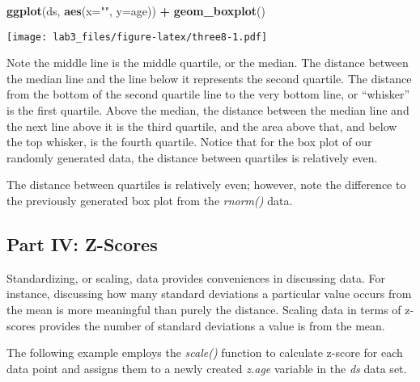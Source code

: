 \documentclass[]{article}
\newenvironment{Shaded}{\begin{snugshade}}{\end{snugshade}}
\newcommand{\KeywordTok}[1]{\textcolor[rgb]{0.13,0.29,0.53}{\textbf{#1}}}
\newcommand{\DataTypeTok}[1]{\textcolor[rgb]{0.13,0.29,0.53}{#1}}
\newcommand{\StringTok}[1]{\textcolor[rgb]{0.31,0.60,0.02}{#1}}
\newcommand{\OperatorTok}[1]{\textcolor[rgb]{0.81,0.36,0.00}{\textbf{#1}}}
\newcommand{\NormalTok}[1]{#1}
\begin{document}
\begin{Shaded}
\begin{Highlighting}[]
\KeywordTok{ggplot}\NormalTok{(ds, }\KeywordTok{aes}\NormalTok{(}\DataTypeTok{x=}\StringTok{""}\NormalTok{, }\DataTypeTok{y=}\NormalTok{age)) }\OperatorTok{+}
\StringTok{  }\KeywordTok{geom_boxplot}\NormalTok{()}
\end{Highlighting}
\end{Shaded}

\texttt{[image: lab3\_files/figure-latex/three8-1.pdf]}

Note the middle line is the middle quartile, or the median. The distance
between the median line and the line below it represents the second
quartile. The distance from the bottom of the second quartile line to
the very bottom line, or ``whisker'' is the first quartile. Above the
median, the distance between the median line and the next line above it
is the third quartile, and the area above that, and below the top
whisker, is the fourth quartile. Notice that for the box plot of our
randomly generated data, the distance between quartiles is relatively
even.

The distance between quartiles is relatively even; however, note the
difference to the previously generated box plot from the \emph{rnorm()}
data.

\subsection{Part IV: Z-Scores}\label{part-iv-z-scores}

Standardizing, or scaling, data provides conveniences in discussing
data. For instance, discussing how many standard deviations a particular
value occurs from the mean is more meaningful than purely the distance.
Scaling data in terms of z-scores provides the number of standard
deviations a value is from the mean.

The following example employs the \emph{scale()} function to calculate
z-score for each data point and assigns them to a newly created
\emph{z.age} variable in the \emph{ds} data set.

\begin{Shaded}
\end{Shaded}
\end{document}
